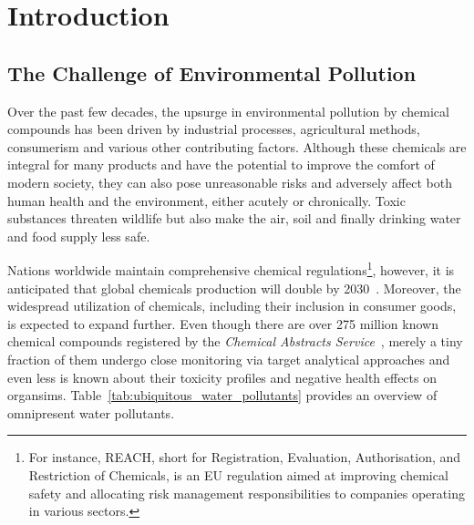 \chapter{Introduction}\label{chap:introduction}

\section{The Challenge of Environmental Pollution}

Over the past few decades, the upsurge in environmental pollution by chemical compounds has been driven by industrial processes, agricultural methods, consumerism and various other contributing factors. Although these chemicals are integral for many products and have the potential to improve the comfort of modern society, they can also pose unreasonable risks and adversely affect both human health and the environment, either acutely or chronically. Toxic substances threaten wildlife but also make the air, soil and finally drinking water and food supply less safe. 

Nations worldwide maintain comprehensive chemical regulations\footnote{For instance, REACH, short for Registration, Evaluation, Authorisation, and Restriction of Chemicals, is an EU regulation aimed at improving chemical safety and allocating risk management responsibilities to companies operating in various sectors.}, however, it is anticipated that global chemicals production will double by 2030~\cite{chemicaloutlook}. Moreover, the widespread utilization of chemicals, including their inclusion in consumer goods, is expected to expand further.
Even though there are over 275 million known chemical compounds registered by the \emph{Chemical Abstracts Service}~\cite{CAS}, merely a tiny fraction of them undergo close monitoring via target analytical approaches and even less is known about their toxicity profiles and negative health effects on organsims. Table~\ref{tab:ubiquitous_water_pollutants} provides an overview of omnipresent water pollutants.

